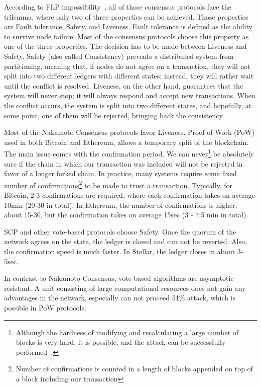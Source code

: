 \documentclass[applsci,article,submit,moreauthors,pdftex]{Definitions/mdpi}
\begin{document}
According to FLP impossibility~\cite{fischer1985impossibility}, all of those consensus protocols face the trilemma, where only two of three properties can be achieved. Those properties are Fault tolerance, Safety, and Liveness. Fault tolerance is defined as the ability to survive node failure. Most of the consensus protocols choose this property as one of the three properties. The decision has to be made between Liveness and Safety. Safety (also called Consistency) prevents a distributed system from partitioning, meaning that, if nodes do not agree on a transaction, they will not split into two different ledgers with different states; instead, they will rather wait until the conflict is resolved. Liveness, on the other hand, guarantees that the system will never stop; it will always respond and accept new transactions. When the conflict occurs, the system is split into two different states, and hopefully, at some point, one of them will be rejected, bringing back the consistency.

Most of the Nakamoto Consensus protocols favor Liveness. Proof-of-Work (PoW) used in both Bitcoin and Ethereum, allows a temporary split of the blockchain. The main issue comes with the confirmation period. We can never\footnote{Although the hardness of modifying and recalculating a large number of blocks is very hard, it is possible, and the attack can be successfully performed~\cite{sayeed2019assessing}.} be absolutely sure if the chain in which our transaction was included will not be rejected in favor of a longer forked chain. In practice, many systems require some fixed number of confirmations\footnote{Number of confirmations is counted in a length of blocks appended on top of a block including our transaction} to be made to trust a transaction. Typically, for Bitcoin, 2-3 confirmations are required, where each confirmation takes on average 10min (20-30 in total). In Ethereum, the number of confirmations is higher, about 15-30, but the confirmation takes on average 15sec (3 - 7.5 min in total). 

SCP and other vote-based protocols choose Safety. Once the quorum of the network agrees on the state, the ledger is closed and can not be reverted. Also, the confirmation speed is much faster. In Stellar, the ledger closes in about 3-5sec. 

In contrast to Nakamoto Consensus, vote-based algorithms are asymptotic resistant. A unit consisting of large computational resources does not gain any advantages in the network, especially can not proceed 51\% attack, which is possible in PoW protocols. 
\end{document}
